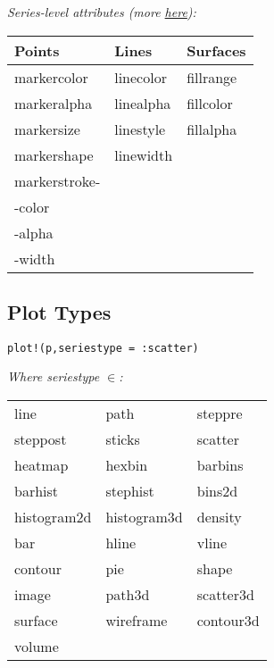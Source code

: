 \textit{Series-level attributes (more \href{https://docs.juliaplots.org/latest/generated/attributes\_series/}{here}):}\\
{\scriptsize
\begin{tabular}{l l l}
    Points                  & Lines          & Surfaces \\ \hline
    markercolor             & linecolor     & fillrange \\
    markeralpha             & linealpha     & fillcolor \\
    markersize              & linestyle     & fillalpha \\
    markershape             & linewidth     & \\
    markerstroke-           & \\
    \phantom{xxxx}-color    & \\
    \phantom{xxxx}-alpha    & \\
    \phantom{xxxx}-width    & \\
\end{tabular}
}

\subsection*{Plot Types}
\begin{lstlisting}
plot!(p,seriestype = :scatter)
\end{lstlisting}

\textit{Where seriestype $\in$:}\\
{\scriptsize
\begin{tabular}{l l l}
    line        & path          & steppre \\
    steppost    & sticks        & scatter \\
    heatmap     & hexbin        & barbins \\
    barhist     & stephist      & bins2d \\
    histogram2d & histogram3d   & density \\
    bar         & hline         & vline \\
    contour     & pie           & shape \\
    image       & path3d        & scatter3d \\
    surface     & wireframe     & contour3d \\
    volume  \\
\end{tabular}
}


